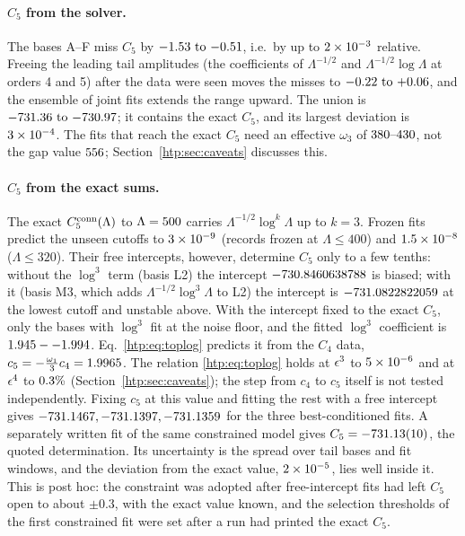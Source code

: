 \paragraph{$C_5$ from the solver.} The bases A--F miss $C_5$ by $-1.53\text{ to }{-0.51}$, i.e.\ by up to $2\times10^{-3}$
relative. Freeing the leading tail amplitudes (the coefficients of $\Lambda^{-1/2}$ and $\Lambda^{-1/2}\log\Lambda$ at
orders 4 and 5) after the data were seen moves the misses to $-0.22\text{ to }{+0.06}$, and the ensemble of joint fits
extends the range upward. The union is $-731.36\text{ to }{-730.97}$; it contains the exact $C_5$, and its largest deviation is
$3\times10^{-4}$. The fits that reach the exact $C_5$ need an effective $\omega_3$ of $380\text{--}430$, not the
gap value $556$; Section~\ref{htp:sec:caveats} discusses this.

\paragraph{$C_5$ from the exact sums.}\label{htp:d1:sec:exact} The exact $C_5^{\rm conn}(\Lambda)$ to
$\Lambda=500$ carries $\Lambda^{-1/2}\log^k\Lambda$ up to $k=3$. Frozen fits predict the unseen cutoffs to
$3\times10^{-9}$ (records frozen at $\Lambda\le400$) and $1.5\times10^{-8}$ ($\Lambda\le320$). Their free
intercepts, however, determine $C_5$ only to a few tenths: without the $\log^3$ term (basis L2) the intercept
$-730.8460638788$ is biased; with it (basis M3, which adds $\Lambda^{-1/2}\log^3\Lambda$ to L2) the intercept is
$-731.0822822059$ at the lowest cutoff and unstable above. With the intercept fixed to the exact $C_5$, only the
bases with $\log^3$ fit at the noise floor, and the fitted $\log^3$ coefficient is $1.945--1.994$.
Eq.~\eqref{htp:eq:toplog} predicts it from the $C_4$ data, $c_5=-\tfrac{\omega_1}{3}c_4=1.9965$. The relation
\eqref{htp:eq:toplog} holds at $\epsilon^3$ to $5\times10^{-6}$ and at $\epsilon^4$ to $0.3\%$
(Section~\ref{htp:sec:caveats}); the step from $c_4$ to $c_5$ itself is not tested independently. Fixing $c_5$ at this value
and fitting the rest with a free intercept gives $-731.1467, -731.1397, -731.1359$ for the three best-conditioned fits. A
separately written fit of the same constrained model gives $C_5=-731.13(10)$, the quoted determination. Its
uncertainty is the spread over tail bases and fit windows, and the deviation from the exact value, $2\times10^{-5}$,
lies well inside it. This is post hoc: the constraint was adopted after free-intercept fits had left $C_5$ open to
about $\pm0.3$, with the exact value known, and the selection thresholds of the first constrained fit were set after a
run had printed the exact $C_5$.

